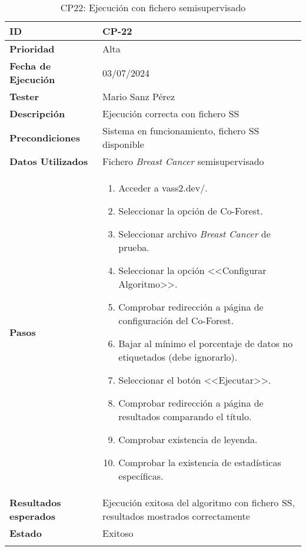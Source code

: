 \begin{longtable}{>{\raggedright\arraybackslash}p{4cm} p{9.5cm}}
    \hline
    \rowcolor{gray!20}
    \textbf{ID} & CP-22\\
    \hline
    \rowcolor{white}
    \textbf{Prioridad} & Alta \\
    \hline
    \rowcolor{gray!20}
    \textbf{Fecha de Ejecución} & 03/07/2024 \\
    \hline
    \rowcolor{white}
    \textbf{Tester} & Mario Sanz Pérez \\
    \hline
    \rowcolor{gray!20}
    \textbf{Descripción} & Ejecución correcta con fichero SS\\
    \hline
    \rowcolor{white}
    \textbf{Precondiciones} & Sistema en funcionamiento, fichero SS disponible\\
    \hline
    \rowcolor{white}
    \textbf{Datos Utilizados} & Fichero \textit{Breast Cancer} semisupervisado \\
    \hline
    \rowcolor{gray!20}
    \textbf{Pasos} & \begin{enumerate}
        \item Acceder a vass2.dev/.
        \item Seleccionar la opción de Co-Forest.
        \item Seleccionar archivo \textit{Breast Cancer} de prueba.
        \item Seleccionar la opción <<Configurar Algoritmo>>.
        \item Comprobar redirección a página de configuración del Co-Forest.
        \item Bajar al mínimo el porcentaje de datos no etiquetados (debe ignorarlo).
        \item Seleccionar el botón <<Ejecutar>>.
        \item Comprobar redirección a página de resultados comparando el título.
        \item Comprobar existencia de leyenda.
        \item Comprobar la existencia de estadísticas específicas.
    \end{enumerate}\\
	\hline
    \rowcolor{gray!20}
    \textbf{Resultados esperados} & Ejecución exitosa del algoritmo con fichero SS, resultados mostrados correctamente\\
    \hline
    \rowcolor{white}
    \textbf{Estado} & Exitoso\\
    \hline
	\caption[CP22: Ejecución con fichero SS]{CP22: Ejecución con fichero semisupervisado}
\end{longtable}

